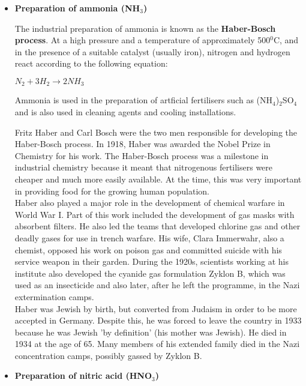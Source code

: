 \begin{itemize} 
\item{\textbf{Preparation of ammonia (NH$_{3}$)}

The industrial preparation of ammonia is known as the \textbf{Haber-Bosch process}. At a high pressure and a temperature of approximately 500$^{0}$C, and in the presence of a suitable catalyst (usually iron), nitrogen and hydrogen react according to the following equation:
\begin{center}
\rm${N_{2} + 3H_{2} \rightarrow 2NH_{3}}$
\end{center}

Ammonia is used in the preparation of artficial fertilisers such as (NH$_{4}$)$_{2}$SO$_{4}$ and is also used in cleaning agents and cooling installations.
}

\begin{IFact}{
Fritz Haber and Carl Bosch were the two men responsible for developing the Haber-Bosch process. In 1918, Haber was awarded the Nobel Prize in Chemistry for his work. The Haber-Bosch process was a milestone in industrial chemistry because it meant that nitrogenous fertilisers were cheaper and much more easily available. At the time, this was very important in providing food for the growing human population.\\

Haber also played a major role in the development of chemical warfare in World War I. Part of this work included the development of gas masks with absorbent filters. He also led the teams that developed chlorine gas and other deadly gases for use in trench warfare. His wife, Clara Immerwahr, also a chemist, opposed his work on poison gas and committed suicide with his service weapon in their garden. During the 1920s, scientists working at his institute also developed the cyanide gas formulation Zyklon B, which was used as an insecticide and also later, after he left the programme, in the Nazi extermination camps. \\

Haber was Jewish by birth, but converted from Judaism in order to be more accepted in Germany. Despite this, he was forced to leave the country in 1933 because he was Jewish 'by definition' (his mother was Jewish). He died in 1934 at the age of 65. Many members of his extended family died in the Nazi concentration camps, possibly gassed by Zyklon B.
}
\end{IFact}

\item{\textbf{Preparation of nitric acid (HNO$_{3}$)}

}
\end{itemize}
